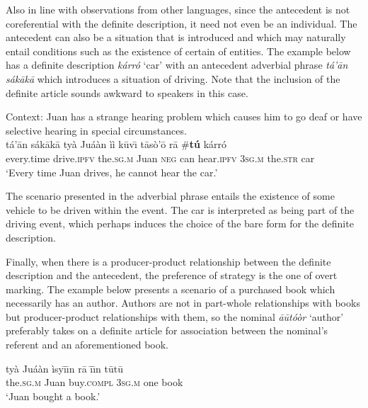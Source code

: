 \documentclass[output=paper,modfonts,nonflat]{langsci/langscibook}
\begin{document}
Also in line with observations from other languages, since the antecedent is not coreferential with the definite description, it need not even be an individual.  The antecedent can also be a situation that is introduced and which may naturally entail conditions such as the existence of certain  of entities.  The example below has a definite description \textit{k\'arr\'o} `car' with an antecedent adverbial phrase \textit{t\'a'\=an s\'ak\=ak\=a} which introduces a situation of driving.  Note that the inclusion of the definite article sounds awkward to speakers in this case.

\ea {}\label{ex:cisneros:71}
Context: Juan has a strange hearing problem which causes him to go deaf or have selective hearing in special circumstances. \\
\gll
{\ob}t\'a'\=an s\'ak\=ak\=a ty\`a Ju\'a\`an{\cb} \`i\`i k\=uv\=\i{} t\=as\`o'\=o r\=a {\ob}{\op}\#\textbf{t\'u}{\cp} k\'arr\'o{\cb}\\
{\db}every.time drive.\textsc{ipfv} the.\textsc{sg.m} Juan \textsc{neg} can hear.\textsc{ipfv} 3\textsc{sg.m} \phantom{[(\#}the.\textsc{str} car\\
\glt
`Every time Juan drives, he cannot hear the car.'
\z 

The scenario presented in the adverbial phrase entails the existence of some vehicle to be driven within the event.  The car is interpreted as being part of the driving event, which perhaps induces the choice of the bare form for the definite description.

Finally, when there is a producer-product relationship between the definite description and the antecedent, the preference of  strategy is the one of overt marking.  The example below presents a scenario of a purchased book which necessarily has an author.  Authors are not in part-whole relationships with books but producer-product relationships with them, so the nominal \textit{\=a\=ut\'o\`or} `author' preferably takes on a definite article for association between the nominal's referent and an aforementioned book.

\ea {}\label{ex:cisneros:72}
\gll
{\ob}ty\`a Ju\'a\`an{\cb} \`isy\=\i\=\i n r\=a {\ob}\=\i\=\i n t\=ut\=u{\cb}\\
{\db}the.\textsc{sg.m} Juan buy.\textsc{compl} 3\textsc{sg.m} {\db}one book\\
\glt
`Juan bought a book.'
\end{document}
